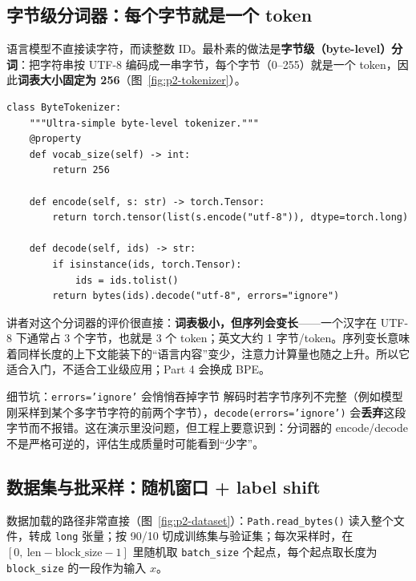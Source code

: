 \subsection{字节级分词器：每个字节就是一个 token}

语言模型不直接读字符，而读整数 ID。最朴素的做法是\textbf{字节级（byte-level）分词}：把字符串按 UTF-8 编码成一串字节，每个字节（0–255）就是一个 token，因此\textbf{词表大小固定为 256}（图~\ref{fig:p2-tokenizer}）。

\begin{lstlisting}[caption={字节级分词器的核心（据视频 \texttt{tokenizer.py} 整理）：编码用 UTF-8 字节，解码把字节串还原成文本。}]
class ByteTokenizer:
    """Ultra-simple byte-level tokenizer."""
    @property
    def vocab_size(self) -> int:
        return 256

    def encode(self, s: str) -> torch.Tensor:
        return torch.tensor(list(s.encode("utf-8")), dtype=torch.long)

    def decode(self, ids) -> str:
        if isinstance(ids, torch.Tensor):
            ids = ids.tolist()
        return bytes(ids).decode("utf-8", errors="ignore")
\end{lstlisting}

讲者对这个分词器的评价很直接：\textbf{词表极小，但序列会变长}——一个汉字在 UTF-8 下通常占 3 个字节，也就是 3 个 token；英文大约 1 字节/token。序列变长意味着同样长度的上下文能装下的“语言内容”变少，注意力计算量也随之上升。所以它适合入门，不适合工业级应用；Part 4 会换成 BPE。

\begin{warningbox}{细节坑：\texttt{errors='ignore'} 会悄悄吞掉字节}
解码时若字节序列不完整（例如模型刚采样到某个多字节字符的前两个字节），\texttt{decode(errors='ignore')} 会\textbf{丢弃}这段字节而不报错。这在演示里没问题，但工程上要意识到：分词器的 encode/decode 不是严格可逆的，评估生成质量时可能看到“少字”。
\end{warningbox}

\subsection{数据集与批采样：随机窗口 + label shift}

数据加载的路径非常直接（图~\ref{fig:p2-dataset}）：\texttt{Path.read\_bytes()} 读入整个文件，转成 \texttt{long} 张量；按 90/10 切成训练集与验证集；每次采样时，在 $[0,\ \text{len}-\text{block\_size}-1]$ 里随机取 \texttt{batch\_size} 个起点，每个起点取长度为 \texttt{block\_size} 的一段作为输入 $x$。

